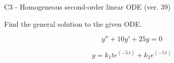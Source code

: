 \begin{exercise}
  \begin{exerciseTitle}C3 - Homogeneous second-order linear ODE (ver. 39)\end{exerciseTitle}
  \begin{exerciseStatement}
    
Find the general solution to the given ODE.

    
\[y''+10y'+25y = 0\]

  \end{exerciseStatement}
  \begin{exerciseAnswer}
    
\[y= k_{1} t e^{\left(-5 \, t\right)} + k_{2} e^{\left(-5 \, t\right)}\]

  \end{exerciseAnswer}
\end{exercise}